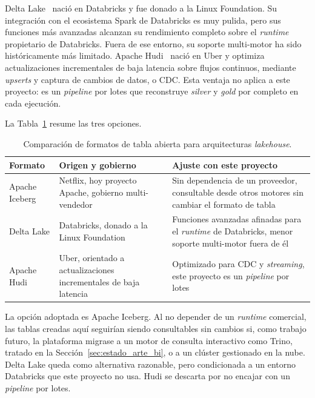 Delta Lake~\cite{delta_lake_docs} nació en Databricks y fue donado a la
Linux Foundation. Su integración con el ecosistema Spark de Databricks es
muy pulida, pero sus funciones más avanzadas alcanzan su rendimiento
completo sobre el \textit{runtime} propietario de Databricks. Fuera de ese
entorno, su soporte multi-motor ha sido históricamente más limitado.
Apache Hudi~\cite{apache_hudi_docs} nació en Uber y optimiza
actualizaciones incrementales de baja latencia sobre flujos continuos,
mediante \textit{upserts} y captura de cambios de datos, o CDC. Esta
ventaja no aplica a este proyecto: es un \textit{pipeline} por lotes que
reconstruye \textit{silver} y \textit{gold} por completo en cada
ejecución.

La Tabla~\ref{tab:tfm_formatos_tabla} resume las tres opciones.

\begin{table}[H]
  \centering
  \small
  \renewcommand{\arraystretch}{1.2}
  \begin{tabular}{p{} p{} p{}}
    \hline
    \textbf{Formato} & \textbf{Origen y gobierno} & \textbf{Ajuste con este proyecto} \\
    \hline
    Apache Iceberg &
      Netflix, hoy proyecto Apache, gobierno multi-vendedor &
      Sin dependencia de un proveedor, consultable desde otros motores sin
      cambiar el formato de tabla \\
    Delta Lake &
      Databricks, donado a la Linux Foundation &
      Funciones avanzadas afinadas para el \textit{runtime} de Databricks,
      menor soporte multi-motor fuera de él \\
    Apache Hudi &
      Uber, orientado a actualizaciones incrementales de baja latencia &
      Optimizado para CDC y \textit{streaming}, este proyecto es un
      \textit{pipeline} por lotes \\
    \hline
  \end{tabular}
  \caption{Comparación de formatos de tabla abierta para arquitecturas \textit{lakehouse}.}
  \label{tab:tfm_formatos_tabla}
\end{table}

La opción adoptada es Apache Iceberg. Al no depender de un
\textit{runtime} comercial, las tablas creadas aquí seguirían siendo
consultables sin cambios si, como trabajo futuro, la plataforma migrase a
un motor de consulta interactivo como Trino, tratado en la
Sección~\ref{sec:estado_arte_bi}, o a un clúster gestionado en la nube.
Delta Lake queda como alternativa razonable, pero condicionada a un
entorno Databricks que este proyecto no usa. Hudi se descarta por no
encajar con un \textit{pipeline} por lotes.

